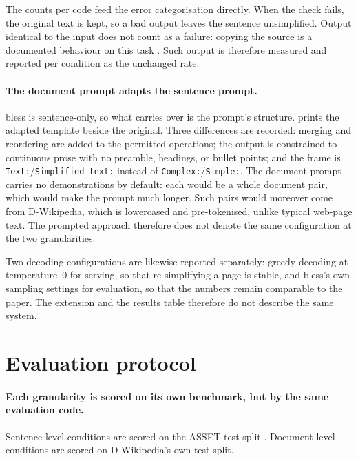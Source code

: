 The counts per code feed the error categorisation directly.
When the check fails, the original text is kept, so a bad output leaves the sentence unsimplified.
Output identical to the input does not count as a failure: copying the source is a documented behaviour on this task \parencite[13298]{kew-etal-2023-bless}.
Such output is therefore measured and reported per condition as the unchanged rate.

\pagebreak

\paragraph{The document prompt adapts the sentence prompt.}
\Gls{bless} is sentence-only, so what carries over is the prompt's structure.
 prints the adapted template beside the original.
Three differences are recorded: merging and reordering are added to the permitted operations; the output is constrained to continuous prose with no preamble, headings, or bullet points; and the frame is \texttt{Text:}/\texttt{Simplified text:} instead of \texttt{Complex:}/\texttt{Simple:}.
The document prompt carries no demonstrations by default: each would be a whole document pair, which would make the prompt much longer.
Such pairs would moreover come from D-Wikipedia, which is lowercased and pre-tokenised, unlike typical web-page text.
The prompted approach therefore does not denote the same configuration at the two granularities.

Two decoding configurations are likewise reported separately: greedy decoding at temperature~0 for serving, so that re-simplifying a page is stable, and \gls{bless}'s own sampling settings \parencite[13293]{kew-etal-2023-bless} for evaluation, so that the numbers remain comparable to the paper.
The extension and the results table therefore do not describe the same system.

\section{Evaluation protocol}
\label{sec:evaluation-protocol}

\paragraph{Each granularity is scored on its own benchmark, but by the same evaluation code.}
Sentence-level conditions are scored on the ASSET test split \parencite[4670--4671]{alva-manchego-etal-2020-asset}.
Document-level conditions are scored on D-Wikipedia's own test split.

